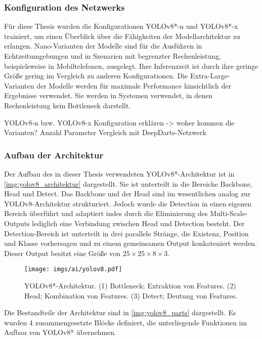 
\subsubsection{Konfiguration des Netzwerks}

Für diese Thesis wurden die Konfigurationen YOLOv8*-n und YOLOv8*-x trainiert, um einen Überblick über die Fähigkeiten der Modellarchitektur zu erlangen. Nano-Varianten der Modelle sind für die Ausführen in Echtzeitumgebungen und in Szenarien mit begrenzter Rechenleistung, beispielsweise in Mobiltelefonen, ausgelegt. Ihre Inferenzzeit ist durch ihre geringe Größe gering im Vergleich zu anderen Konfigurationen. Die Extra-Large-Varianten der Modelle werden für maximale Performance hinsichtlich der Ergebnisse verwendet. Sie werden in Systemen verwendet, in denen Rechenleistung kein Bottleneck darstellt.


YOLOv8-n bzw. YOLOv8-x
Konfiguration erklären -> woher kommen die Varianten?
Anzahl Parameter
Vergleich mit DeepDarts-Netzwerk

\subsubsection{Aufbau der Architektur}

Der Aufbau des in dieser Thesis verwendeten YOLOv8*-Architektur ist in \autoref{img:yolov8_architektur} dargestellt. Sie ist unterteilt in die Bereiche Backbone, Head und Detect. Das Backbone und der Head sind im wesentlichen analog zur YOLOv8-Architektur strukturiert. Jedoch wurde die Detection in einen eigenen Bereich überführt und adaptiert indes durch die Eliminierung des Multi-Scale-Outputs lediglich eine Verbindung zwischen Head und Detection besteht. Der Detection-Bereich ist unterteilt in drei parallele Stränge, die Existenz, Position und Klasse vorhersagen und zu einem gemeinsamen Output konkateniert werden. Dieser Output besitzt eine Größe von $25 \times 25 \times 8 \times 3$.

\begin{figure}
    \centering
    \texttt{[image: imgs/ai/yolov8.pdf]}
    \caption{YOLOv8*-Architektur. (1) Bottleneck; Extraktion von Features. (2) Head; Kombination von Features. (3) Detect; Deutung von Features.}
    \label{img:yolov8_architektur}
\end{figure}

Die Bestandteile der Architektur sind in \autoref{img:yolov8_parts} dargestellt. Es wurden 4 zusammengesetzte Blöcke definiert, die unterliegende Funktionen im Aufbau von YOLOv8* übernehmen.

